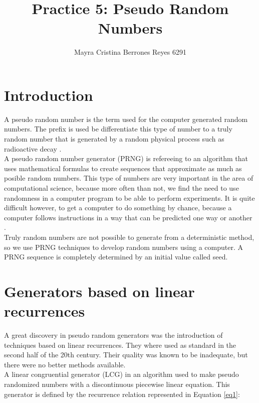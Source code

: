 \documentclass{article}
\begin{document}
\title{%
  Practice 5: Pseudo Random Numbers} %
\author{Mayra Cristina Berrones Reyes 6291}

\maketitle

\section{Introduction}

A pseudo random number is the term used for the computer generated random numbers. The prefix  is used be differentiate this type of number to a truly random number that is generated by a random physical process such as radioactive decay \cite{w-pseudo}. \\

A pseudo random number generator (PRNG) is refereeing to an algorithm that uses mathematical formulas to create sequences that approximate as much as posible random numbers. This type of numbers are very important in the area of computational science, because more often than not, we find the need to use randomness in a computer program to be able to perform experiments. It is quite difficult however, to get a computer to do something by chance, because a computer follows instructions in a way that can be predicted one way or another \cite{geeks1}. \\

Truly random numbers are not possible to generate from a deterministic method, so we use PRNG techniques to develop random numbers using a computer. A PRNG sequence is completely determined by an initial value called seed. \\

\section{Generators based on linear recurrences}\label{gen}

A great discovery in pseudo random generators was the introduction of techniques based on linear recurrences. They where used as standard in the second half of the 20th century. Their quality was known to be inadequate, but there were no better methods available. \\

A linear congruential generator (LCG) in an algorithm used to make pseudo randomized numbers with a discontinuous piecewise linear equation. This generator is defined by the recurrence relation represented in Equation \ref{eq1}:\\
\end{document}
